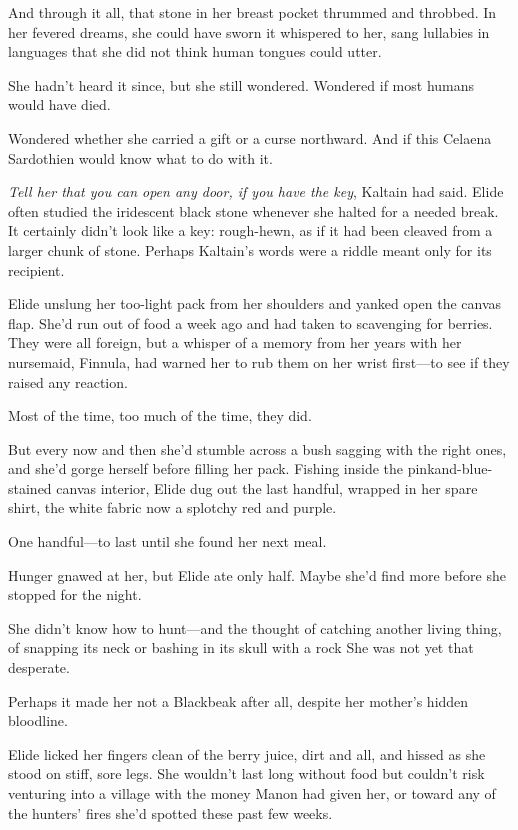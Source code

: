 And through it all, that stone in her breast pocket thrummed and throbbed. In her fevered dreams, she could have sworn it whispered to her, sang lullabies in languages that she did not think human tongues could utter.

She hadn't heard it since, but she still wondered. Wondered if most humans would have died.

Wondered whether she carried a gift or a curse northward. And if this Celaena Sardothien would know what to do with it.

\emph{Tell her that you can open any door, if you have the key}, Kaltain had said. Elide often studied the iridescent black stone whenever she halted for a needed break. It certainly didn't look like a key:
rough-hewn, as if it had been cleaved from a larger chunk of stone. Perhaps Kaltain's words were a riddle meant only for its recipient.

Elide unslung her too-light pack from her shoulders and yanked open the canvas flap. She'd run out of food a week ago and had taken to scavenging for berries. They were all foreign, but a whisper of a memory from her years with her nursemaid, Finnula, had warned her to rub them on her wrist first---to see if they raised any reaction.

Most of the time, too much of the time, they did.

But every now and then she'd stumble across a bush sagging with the right ones, and she'd gorge herself before filling her pack. Fishing inside the pinkand-blue-stained canvas interior, Elide dug out the last handful, wrapped in her spare shirt, the white fabric now a splotchy red and purple.

One handful---to last until she found her next meal.

Hunger gnawed at her, but Elide ate only half. Maybe she'd find more before she stopped for the night.

She didn't know how to hunt---and the thought of catching another living thing, of snapping its neck or bashing in its skull with a rock 
She was not yet that desperate.

Perhaps it made her not a Blackbeak after all, despite her mother's hidden bloodline.

Elide licked her fingers clean of the berry juice, dirt and all, and hissed as she stood on stiff, sore legs. She wouldn't last long without food but couldn't risk venturing into a village with the money Manon had given her, or toward any of the hunters' fires she'd spotted these past few weeks.

